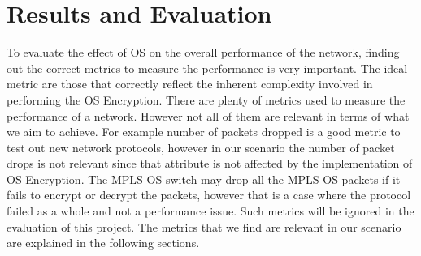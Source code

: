 \chapter{Results and Evaluation}
To evaluate the effect of OS on the overall performance of the network, finding out the correct metrics to measure the performance is very important. The ideal metric are those that correctly reflect the inherent complexity involved in performing the OS Encryption. There are plenty of metrics used to measure the performance of a network. However not all of them are relevant in terms of what we aim to achieve. For example number of packets dropped is a good metric to test out new network protocols, however in our scenario the number of packet drops is not relevant since that attribute is not affected by the implementation of OS Encryption. The MPLS OS switch may drop all the MPLS OS packets if it fails to encrypt or decrypt the packets, however that is a case where the protocol failed as a whole and not a performance issue. Such metrics will be ignored in the evaluation of this project. The metrics that we find are relevant in our scenario are explained in the following sections.
    

